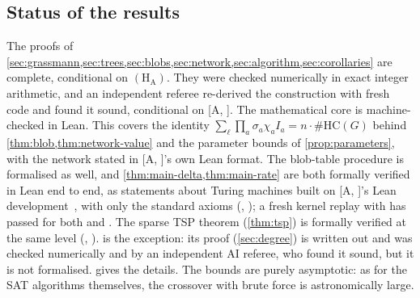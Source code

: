 \documentclass[11pt]{amsart}
\theoremstyle{plain}
\theoremstyle{definition}
\theoremstyle{remark}
\numberwithin{equation}{section}
\newcommand{\A}[1][]{\textup{[A\if\relax\detokenize{#1}\relax\else, #1\fi]}}
\begin{document}
\subsection{Status of the results}
The proofs of \cref{sec:grassmann,sec:trees,sec:blobs,sec:network,sec:algorithm,sec:corollaries}
are complete, conditional on $(\mathrm{H}_{\mathrm{A}})$. They were checked numerically in exact
integer arithmetic, and an independent referee re-derived the construction with fresh code and
found it sound, conditional on \A. The mathematical core is machine-checked in Lean. This
covers the identity $\sum_\ell\prod_a\sigma_a\chi_aI_a=n\cdot\#\mathrm{HC}(G)$ behind
\cref{thm:blob,thm:network-value} and the parameter bounds of \cref{prop:parameters}, with the
network stated in \A's own Lean format. The blob-table procedure is formalised as well, and
\cref{thm:main-delta,thm:main-rate} are both formally verified in Lean end to end, as statements
about Turing machines built on \A's Lean development~\cite{TulsyanRepo26}, with only the standard axioms
(, ); a fresh kernel replay with  has passed
for both  and . The sparse TSP theorem (\cref{thm:tsp}) is formally
verified at the same level (, ).
 is the exception: its proof (\cref{sec:degree}) is written out and was
checked numerically and by an independent AI referee, who found it sound, but it is not
formalised.  gives the details. The bounds are purely asymptotic: as for
the SAT algorithms themselves, the crossover with brute force is astronomically large.
\end{document}
